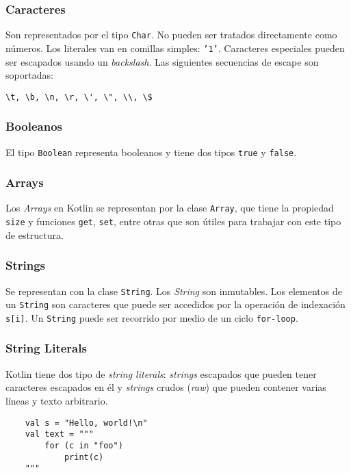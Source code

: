 \subsubsection{Caracteres}
Son representados por el tipo \texttt{Char}. No pueden ser tratados directamente como números. Los literales van en comillas simples: \texttt{'1'}. Caracteres especiales pueden ser escapados usando un \emph{backslash}. Las siguientes secuencias de escape son soportadas: 
\begin{verbatim}\t, \b, \n, \r, \', \", \\, \$
\end{verbatim}

\subsubsection{Booleanos}
El tipo \texttt{Boolean} representa booleanos y tiene dos tipos \texttt{true} y \texttt{false}.

\subsubsection{Arrays}
Los \emph{Arrays} en Kotlin se representan por la clase \texttt{Array}, que tiene la propiedad \texttt{size} y funciones \texttt{get}, \texttt{set}, entre otras que son útiles para trabajar con este tipo de estructura.

\subsubsection{Strings}
Se representan con la clase \texttt{String}. Los \emph{String} son inmutables. Los elementos de un \texttt{String} son caracteres que puede ser accedidos por la operación de indexación \texttt{s[i]}. Un \texttt{String} puede ser recorrido por medio de un ciclo \texttt{for-loop}.

\subsubsection{String Literals}
Kotlin tiene dos tipo de \emph{string literals}: \emph{strings} escapados que pueden tener caracteres escapados en él y \emph{strings} crudos (\emph{raw}) que pueden contener varias líneas y texto arbitrario.
\begin{verbatim}
    val s = "Hello, world!\n"
    val text = """
        for (c in "foo") 
            print(c)
    """
\end{verbatim}

